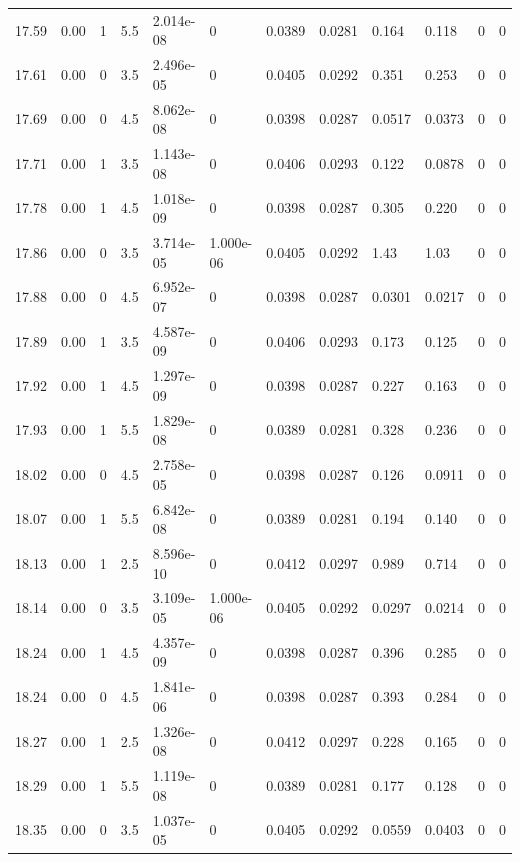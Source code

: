 \documentclass[preview]{standalone}
\begin{document}
{{{{{{{{{{{{\begin{tabular}{L{1.2cm}C{1.2cm} C{0.3cm}C{0.5cm} C{1.4cm}C{1.4cm} C{1.4cm}C{1.4cm} C{1.6cm}C{1.6cm} C{1.6cm}C{1.6cm}}
  17.59  &  0.00  & 1     & 5.5 &  2.014e-08  & 0  &  0.0389&   0.0281& 0.164 & 0.118   &  0 & 0  \\ 
  17.61  &  0.00  & 0     & 3.5 &  2.496e-05  & 0  &  0.0405&   0.0292& 0.351 & 0.253   &  0 & 0  \\ 
  17.69  &  0.00  & 0     & 4.5 &  8.062e-08  & 0  &  0.0398&   0.0287& 0.0517 & 0.0373   &  0 & 0  \\ 
  17.71  &  0.00  & 1     & 3.5 &  1.143e-08  & 0  &  0.0406&   0.0293& 0.122 & 0.0878   &  0 & 0  \\ 
  17.78  &  0.00  & 1     & 4.5 &  1.018e-09  & 0  &  0.0398&   0.0287& 0.305 & 0.220   &  0 & 0  \\ 
  17.86  &  0.00  & 0     & 3.5 &  3.714e-05  & 1.000e-06  &  0.0405&   0.0292& 1.43 & 1.03   &  0 & 0  \\ 
  17.88  &  0.00  & 0     & 4.5 &  6.952e-07  & 0  &  0.0398&   0.0287& 0.0301 & 0.0217   &  0 & 0  \\ 
  17.89  &  0.00  & 1     & 3.5 &  4.587e-09  & 0  &  0.0406&   0.0293& 0.173 & 0.125   &  0 & 0  \\ 
  17.92  &  0.00  & 1     & 4.5 &  1.297e-09  & 0  &  0.0398&   0.0287& 0.227 & 0.163   &  0 & 0  \\ 
  17.93  &  0.00  & 1     & 5.5 &  1.829e-08  & 0  &  0.0389&   0.0281& 0.328 & 0.236   &  0 & 0  \\ 
  18.02  &  0.00  & 0     & 4.5 &  2.758e-05  & 0  &  0.0398&   0.0287& 0.126 & 0.0911   &  0 & 0  \\ 
  18.07  &  0.00  & 1     & 5.5 &  6.842e-08  & 0  &  0.0389&   0.0281& 0.194 & 0.140   &  0 & 0  \\ 
  18.13  &  0.00  & 1     & 2.5 &  8.596e-10  & 0  &  0.0412&   0.0297& 0.989 & 0.714   &  0 & 0  \\ 
  18.14  &  0.00  & 0     & 3.5 &  3.109e-05  & 1.000e-06  &  0.0405&   0.0292& 0.0297 & 0.0214   &  0 & 0  \\ 
  18.24  &  0.00  & 1     & 4.5 &  4.357e-09  & 0  &  0.0398&   0.0287& 0.396 & 0.285   &  0 & 0  \\ 
  18.24  &  0.00  & 0     & 4.5 &  1.841e-06  & 0  &  0.0398&   0.0287& 0.393 & 0.284   &  0 & 0  \\ 
  18.27  &  0.00  & 1     & 2.5 &  1.326e-08  & 0  &  0.0412&   0.0297& 0.228 & 0.165   &  0 & 0  \\ 
  18.29  &  0.00  & 1     & 5.5 &  1.119e-08  & 0  &  0.0389&   0.0281& 0.177 & 0.128   &  0 & 0  \\ 
  18.35  &  0.00  & 0     & 3.5 &  1.037e-05  & 0  &  0.0405&   0.0292& 0.0559 & 0.0403   &  0 & 0  \\ 

\end{tabular}}}}}}}}}}}}}
\end{document}
